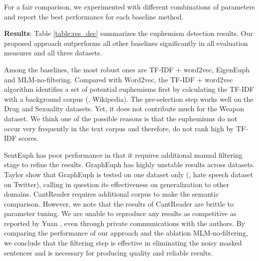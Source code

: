 For a fair comparison, we experimented with different combinations of parameters and report the best performance for each baseline method. 

\noindent \textbf{Results}: 
Table \ref{table:res_dec} summarizes the euphemism detection results. 
Our proposed approach outperforms all other baselines significantly in all evaluation measures and all three datasets. 

Among the baselines, the most robust ones are TF-IDF + word2vec, EigenEuph \cite{magu2018determining} and MLM-no-filtering. 
Compared with Word2vec, the TF-IDF + word2vec algorithm identifies a set of potential euphemisms first by calculating the TF-IDF with a background corpus (\ie, Wikipedia). 
The pre-selection step works well on the Drug and Sexuality datasets. 
Yet, it does not contribute much for the Weapon dataset. 
We think one of the possible reasons is that the euphemisms do not occur very frequently in the text corpus and therefore, do not rank high by TF-IDF scores. 


SentEuph \cite{felt2020recognizing} has poor performance in that it requires additional manual filtering stage to refine the results. 
GraphEuph \cite{taylor2017surfacing} has highly unstable results across datasets. 
Taylor \etal \cite{taylor2017surfacing} show that GraphEuph is tested on one dataset only (\ie, hate speech dataset on Twitter), calling in question its effectiveness on generalization to other domains. 
CantReader \cite{yuan2018reading} requires additional corpus to make the semantic comparison. 
However, we note that the results of CantReader are brittle to parameter tuning. 
We are unable to reproduce any results as competitive as reported by Yuan \etal \cite{yuan2018reading}, even through private communications with the authors. 
By comparing the performance of our approach and the ablation MLM-no-filtering, we conclude that the filtering step is effective in eliminating the noisy masked sentences and is necessary for producing quality and reliable results. 



